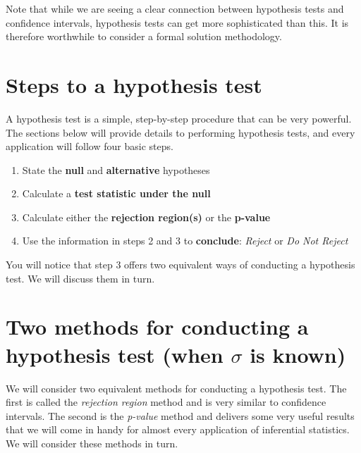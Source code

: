 \documentclass[
]{book}
\begin{document}
Note that while we are seeing a clear connection between hypothesis tests and confidence intervals, hypothesis tests can get more sophisticated than this. It is therefore worthwhile to consider a formal solution methodology.

\hypertarget{steps-to-a-hypothesis-test}{%
\section{Steps to a hypothesis test}\label{steps-to-a-hypothesis-test}}

A hypothesis test is a simple, step-by-step procedure that can be very powerful. The sections below will provide details to performing hypothesis tests, and every application will follow four basic steps.

\begin{enumerate}
\def\labelenumi{\arabic{enumi}.}
\item
  State the \textbf{null} and \textbf{alternative} hypotheses
\item
  Calculate a \textbf{test statistic under the null}
\item
  Calculate either the \textbf{rejection region(s)} or the \textbf{p-value}
\item
  Use the information in steps 2 and 3 to \textbf{conclude}: \emph{Reject} or \emph{Do Not Reject}
\end{enumerate}

You will notice that step 3 offers two equivalent ways of conducting a hypothesis test. We will discuss them in turn.

\hypertarget{two-methods-for-conducting-a-hypothesis-test-when-sigma-is-known}{%
\section{\texorpdfstring{Two methods for conducting a hypothesis test (when \(\sigma\) is known)}{Two methods for conducting a hypothesis test (when \textbackslash sigma is known)}}\label{two-methods-for-conducting-a-hypothesis-test-when-sigma-is-known}}

We will consider two equivalent methods for conducting a hypothesis test. The first is called the \emph{rejection region} method and is very similar to confidence intervals. The second is the \emph{p-value} method and delivers some very useful results that we will come in handy for almost every application of inferential statistics. We will consider these methods in turn.
\end{document}
